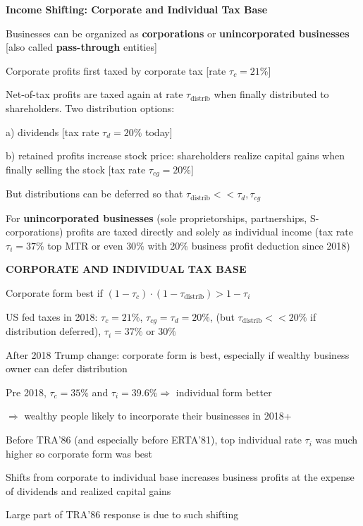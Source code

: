 \documentclass[landscape]{slides}
\begin{document}
\begin{slide}
\begin{center}
{\bf Income Shifting: Corporate and Individual Tax Base}
\end{center}
Businesses can be organized as {\bf corporations} or {\bf
unincorporated businesses} [also called {\bf pass-through}
entities]

Corporate profits first taxed by corporate tax [rate
$\tau_c = 21\%$]

Net-of-tax profits are taxed again at rate $\tau_{\text{distrib}}$  when finally distributed to
shareholders. Two distribution options:

a) dividends [tax rate $\tau_d = 20\%$ today]

b) retained profits increase stock price: shareholders realize
capital gains when finally selling the stock [tax rate
$\tau_{cg}=20\%$]

\vspace{-0.5cm}

But distributions can be deferred so that $\tau_{\text{distrib}}<<\tau_d, \tau_{cg}$

For {\bf unincorporated businesses} (sole proprietorships,
partnerships, S-corporations) profits are taxed directly and
solely as individual income (tax rate $\tau_i = 37\%$ top MTR or even $30\%$ with 20\% business profit deduction since 2018)
\end{slide}


\begin{slide}
\begin{center}
{\bf CORPORATE AND INDIVIDUAL TAX BASE}
\end{center}
Corporate form best if $(1-\tau_c) \cdot (1-\tau_{\text{distrib}})>1-\tau_i$

US fed taxes in 2018: $\tau_c=21\%$, $\tau_{cg}=\tau_d=20\%$,
(but $\tau_{\text{distrib}}<<20\%$ if distribution deferred), 
$\tau_i=37\%$ or $30\%$ 

After 2018 Trump change: corporate form is best, especially if 
wealthy business owner can defer distribution

Pre 2018, $\tau_c=35\%$ and $\tau_i=39.6\% \Rightarrow$ individual form better

$\Rightarrow$ wealthy people likely to incorporate their businesses in 2018+

\small
Before TRA'86 (and especially before ERTA'81), top individual rate
$\tau_i$ was much higher so corporate form was best

Shifts from corporate to individual base increases business
profits at the expense of dividends and realized capital gains

Large part of TRA'86 response is due to such shifting
\end{slide}
\end{document}
